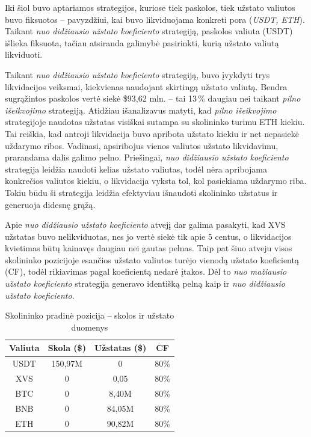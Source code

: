 \documentclass[]{VUMIFTemplateClass}
\begin{document}
Iki šiol buvo aptariamos strategijos, kuriose tiek paskolos, tiek užstato valiutos buvo fiksuotos – pavyzdžiui, kai buvo likviduojama konkreti pora (\textit{USDT, ETH}). Taikant \textit{nuo didžiausio užstato koeficiento} strategiją, paskolos valiuta (USDT) išlieka fiksuota, tačiau atsiranda galimybė pasirinkti, kurią užstato valiutą likviduoti. 

Taikant \textit{nuo didžiausio užstato koeficiento} strategiją, buvo įvykdyti trys likvidacijos veiksmai, kiekvienas naudojant skirtingą užstato valiutą. Bendra sugrąžintos paskolos vertė siekė \$93{,}62 mln. – tai 13\,\% daugiau nei taikant \textit{pilno išeikvojimo} strategiją. Atidžiau išanalizavus matyti, kad \textit{pilno išeikvojimo} strategijoje naudotas užstatas visiškai sutampa su skolininko turimu ETH kiekiu. Tai reiškia, kad antroji likvidacija buvo apribota užstato kiekiu ir net nepasiekė uždarymo ribos. Vadinasi, apsiribojus vienos valiutos užstato likvidavimu, prarandama dalis galimo pelno. Priešingai, \textit{nuo didžiausio užstato koeficiento} strategija leidžia naudoti kelias užstato valiutas, todėl nėra apribojama konkrečios valiutos kiekiu, o likvidacija vyksta tol, kol pasiekiama uždarymo riba. Tokiu būdu ši strategija leidžia efektyviau išnaudoti skolininko užstatus ir generuoja didesnę grąžą.

Apie \textit{nuo didžiausio užstato koeficiento} atvejį dar galima pasakyti, kad XVS užstatas buvo nelikviduotas, nes jo vertė siekė tik apie 5 centus, o likvidacijos kvietimas būtų kainavęs daugiau nei gautas pelnas. Taip pat šiuo atveju visos skolininko pozicijoje esančios užstato valiutos turėjo vienodą užstato koeficientą (CF), todėl rikiavimas pagal koeficientą nedarė įtakos. Dėl to \textit{nuo mažiausio užstato koeficiento} strategija generavo identišką pelną kaip ir \textit{nuo didžiausio užstato koeficiento}.

\begin{table}[H]
\centering
\caption{Skolininko pradinė pozicija – skolos ir užstato duomenys}
\label{tab:strategijos_cf_analize}
\begin{tabular}{|c|c|c|c|}
\hline
\textbf{Valiuta} & \textbf{Skola (\$)} & \textbf{Užstatas (\$)} & \textbf{CF} \\ \hline
USDT &  150,97M   &  0        & 80\%  \\ \hline
XVS  &  0         &  0,05     & 80\%  \\ \hline
BTC  &  0         &  8,40M    & 80\%  \\ \hline
BNB  &  0         &  84,05M   & 80\%  \\ \hline
ETH  &  0         &  90,82M   & 80\%  \\ \hline
\end{tabular}
\end{table}
\end{document}
